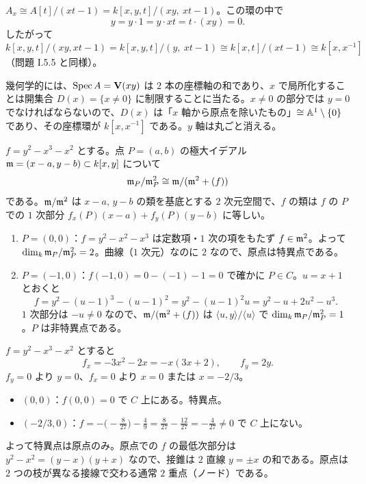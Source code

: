 $A_x\cong A[t]/(xt-1)=k[x,y,t]/(xy,\ xt-1)$。この環の中で
\[
  y=y\cdot1=y\cdot xt=t\cdot(xy)=0.
\]
したがって $k[x,y,t]/(xy,xt-1)=k[x,y,t]/(y,\ xt-1)\cong k[x,t]/(xt-1)\cong k[x,x^{-1}]$（問題 I.5.5 と同様）。

幾何学的には、$\operatorname{Spec} A=\mathbf{V}(xy)$ は $2$ 本の座標軸の和であり、$x$ で局所化することは開集合 $D(x)=\{x\neq0\}$ に制限することに当たる。$x\neq0$ の部分では $y=0$ でなければならないので、$D(x)$ は「$x$ 軸から原点を除いたもの」$\cong\mathbb{A}^1\setminus\{0\}$ であり、その座標環が $k[x,x^{-1}]$ である。$y$ 軸は丸ごと消える。

$f=y^2-x^3-x^2$ とする。点 $P=(a,b)$ の極大イデアル $\mathfrak{m}=(x-a,y-b)\subset k[x,y]$ について
\[
  \mathfrak{m}_P/\mathfrak{m}_P^2\cong\mathfrak{m}/(\mathfrak{m}^2+(f))
\]
である。$\mathfrak{m}/\mathfrak{m}^2$ は $x-a$, $y-b$ の類を基底とする $2$ 次元空間で、$f$ の類は $f$ の $P$ での $1$ 次部分 $f_x(P)(x-a)+f_y(P)(y-b)$ に等しい。
\begin{enumerate}
  \item $P=(0,0)$：$f=y^2-x^2-x^3$ は定数項・$1$ 次の項をもたず $f\in\mathfrak{m}^2$。よって $\dim_k\mathfrak{m}_P/\mathfrak{m}_P^2=2$。曲線（$1$ 次元）なのに $2$ なので、原点は特異点である。
  \item $P=(-1,0)$：$f(-1,0)=0-(-1)-1=0$ で確かに $P\in C$。$u=x+1$ とおくと
  \[
    f=y^2-(u-1)^3-(u-1)^2=y^2-(u-1)^2u=y^2-u+2u^2-u^3.
  \]
  $1$ 次部分は $-u\neq0$ なので、$\mathfrak{m}/(\mathfrak{m}^2+(f))$ は $\langle u,y\rangle/\langle u\rangle$ で $\dim_k\mathfrak{m}_P/\mathfrak{m}_P^2=1$。$P$ は非特異点である。
\end{enumerate}

$f=y^2-x^3-x^2$ とすると
\[
  f_x=-3x^2-2x=-x(3x+2),\qquad f_y=2y.
\]
$f_y=0$ より $y=0$、$f_x=0$ より $x=0$ または $x=-2/3$。
\begin{itemize}
  \item $(0,0)$：$f(0,0)=0$ で $C$ 上にある。特異点。
  \item $(-2/3,0)$：$f=-\bigl(-\tfrac{8}{27}\bigr)-\tfrac49=\tfrac{8}{27}-\tfrac{12}{27}=-\tfrac{4}{27}\neq0$ で $C$ 上にない。
\end{itemize}
よって特異点は原点のみ。原点での $f$ の最低次部分は $y^2-x^2=(y-x)(y+x)$ なので、接錐は $2$ 直線 $y=\pm x$ の和である。原点は $2$ つの枝が異なる接線で交わる通常 $2$ 重点（ノード）である。

\begin{center}
\end{center}


